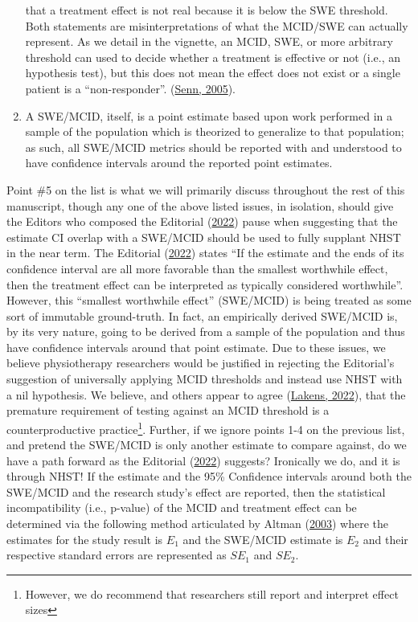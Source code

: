\documentclass[]{cik}%
\begin{document}
\begin{enumerate}
{    that a treatment effect is not real because it is below the SWE
    threshold. Both statements are misinterpretations of what the
    MCID/SWE can actually represent. As we detail in the vignette, an
    MCID, SWE, or more arbitrary threshold can used to decide whether a
    treatment is effective or not (i.e., an hypothesis test), but this
    does not mean the effect does not exist or a single patient is a
    ``non-responder''.}
  (\protect\hyperlink{ref-senn2005dichotomania}{Senn, 2005}).
\item
  A SWE/MCID, itself, is a point estimate based upon work performed in a
  sample of the population which is theorized to generalize to that
  population; as such, all SWE/MCID metrics should be reported with and
  understood to have confidence intervals around the reported point
  estimates.
\end{enumerate}

Point \#5 on the list is what we will primarily discuss throughout the
rest of this manuscript, though any one of the above listed issues, in
isolation, should give the Editors who composed the Editorial
(\protect\hyperlink{ref-elkins2022}{2022}) pause when suggesting that
the estimate CI overlap with a SWE/MCID should be used to fully supplant
NHST in the near term. The Editorial
(\protect\hyperlink{ref-elkins2022}{2022}) states ``If the estimate and
the ends of its confidence interval are all more favorable than the
smallest worthwhile effect, then the treatment effect can be interpreted
as typically considered worthwhile''. However, this ``smallest
worthwhile effect'' (SWE/MCID) is being treated as some sort of
immutable ground-truth. In fact, an empirically derived SWE/MCID is, by
its very nature, going to be derived from a sample of the population and
thus have confidence intervals around that point estimate. Due to these
issues, we believe physiotherapy researchers would be justified in
rejecting the Editorial's suggestion of universally applying MCID
thresholds and instead use NHST with a nil hypothesis. We believe, and
others appear to agree (\protect\hyperlink{ref-lakensres}{Lakens,
2022}), that the premature requirement of testing against an MCID
threshold is a counterproductive practice\footnote{However, we do
  recommend that researchers still report and interpret effect sizes}.
Further, if we ignore points 1-4 on the previous list, and pretend the
SWE/MCID is only another estimate to compare against, do we have a path
forward as the Editorial (\protect\hyperlink{ref-elkins2022}{2022})
suggests? Ironically we do, and it is through NHST! If the estimate and
the 95\% Confidence intervals around both the SWE/MCID and the research
study's effect are reported, then the statistical incompatibility (i.e.,
p-value) of the MCID and treatment effect can be determined via the
following method articulated by Altman
(\protect\hyperlink{ref-altman2003}{2003}) where the estimates for the
study result is \(E_1\) and the SWE/MCID estimate is \(E_2\) and their
respective standard errors are represented as \(SE_1\) and \(SE_2\).
\end{document}
